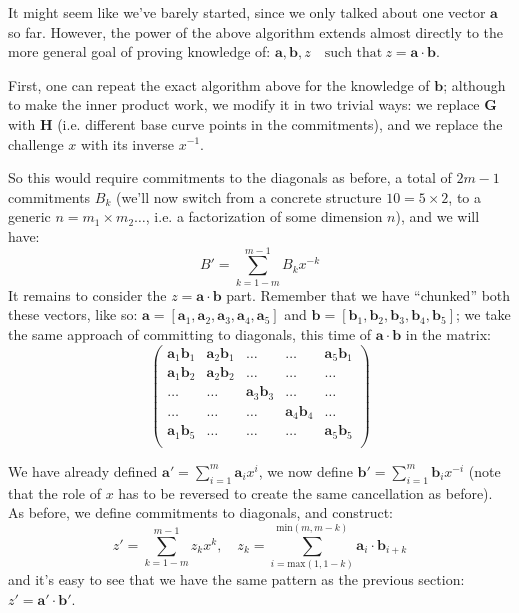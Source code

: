 \documentclass[10pt,a4paper]{article}
\begin{document}
It might seem like we've barely started, since we only talked about one
vector $\mathbf{a}$ so far. However, the power of the above algorithm extends almost
directly to the more general goal of proving knowledge of: $\textbf{a},\textbf{b},z \quad \textrm{such that} \ z = \textbf{a}\cdot\textbf{b}$.

First, one can repeat the exact algorithm above for the knowledge of $\mathbf{b}$;
although to make the inner product work, we modify it in two trivial
ways: we replace $\mathbf{G}$ with $\mathbf{H}$ (i.e. different base curve points in the commitments), and we replace the challenge $x$ with its inverse $x^{-1}$.

So this would require commitments to the diagonals as before, a total of $2m-1$
commitments $B_k$ (we'll now switch from a concrete structure $10=5\times 2$, to a generic $n = m_1 \times m_2 \ldots$,
i.e. a factorization of some dimension $n$), and we will have:
\[B' = \sum\limits_{k=1-m}^{m-1} B_k x^{-k}\]
It remains to consider the $z = \textbf{a}\cdot\textbf{b}$ part. Remember that we have ``chunked'' both
these vectors, like so: $\textbf{a} = [\textbf{a}_1, \textbf{a}_2,  \textbf{a}_3,  \textbf{a}_4,  \textbf{a}_5 ]$ and $\textbf{b} = [\textbf{b}_1, \textbf{b}_2,  \textbf{b}_3,  \textbf{b}_4,  \textbf{b}_5 ]$; we take the same approach of committing to
diagonals, this time of $\mathbf{a}\cdot \mathbf{b}$ in the matrix:
\[
\begin{pmatrix}
\textbf{a}_1\textbf{b}_1 & \textbf{a}_2\textbf{b}_1 & \dots & \dots & \textbf{a}_5\textbf{b}_1 \\
\textbf{a}_1\textbf{b}_2 &  \textbf{a}_2\textbf{b}_2& \dots & \dots & \dots \\
\dots & \dots & \textbf{a}_3\textbf{b}_3 & \dots & \dots \\
\dots & \dots & \dots & \textbf{a}_4\textbf{b}_4 & \dots  \\
\textbf{a}_1\textbf{b}_5 & \dots & \dots & \dots & \textbf{a}_5\textbf{b}_5 \\
\end{pmatrix}
\]

We have already defined $\textbf{a}' = \sum_{i=1}^{m}\textbf{a}_i x^i$, we now define  $\textbf{b}' = \sum_{i=1}^{m}\textbf{b}_i x^{-i}$ (note that the role of $x$ has to be
reversed to create the same cancellation as before). As before, we
define commitments to diagonals, and construct:
\[z' = \sum\limits_{k=1-m}^{m-1} z_k x^k , \quad z_k = \sum\limits_{i=\textrm{max}(1, 1-k)}^{\textrm{min}(m, m-k)}\textbf{a}_i \cdot \textbf{b}_{i+k}\]
and it's easy to see that we have the same pattern as the previous
section: $z' = \textbf{a}' \cdot \textbf{b}'$.
\end{document}
